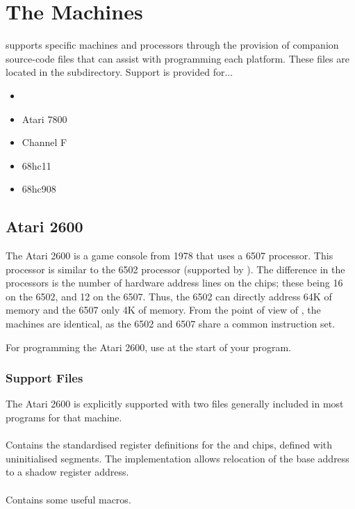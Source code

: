 \chapter{The Machines}

\dasm supports specific machines and processors through the provision of companion source-code files that can assist with programming each platform. These files are located in the  subdirectory. Support is provided for...

\begin{itemize}
\item {}
\item Atari 7800
\item Channel F
\item 68hc11
\item 68hc908
\end{itemize}


\section{Atari 2600}
\label{machine:atari2600}

The Atari 2600 is a game console from 1978 that uses a 6507 processor. This processor is similar to the 6502 processor (supported by \dasm). The difference in the processors is the number of hardware address lines on the chips; these being 16 on the 6502, and 12 on the 6507. Thus, the 6502 can directly address 64K of memory and the 6507 only 4K of memory.  From the point of view of \dasm, the machines are identical, as the 6502 and 6507 share a common instruction set.

For programming the Atari 2600, use  at the start of your program.

\subsection{Support Files}

The Atari 2600 is explicitly supported with two files generally included in most programs for that machine.

\subsubsection{}

Contains the standardised register definitions for the  and  chips, defined with uninitialised segments. The implementation allows relocation of the  base address to a shadow register address.

\subsubsection{}
\label{support6502}

Contains some useful macros.



